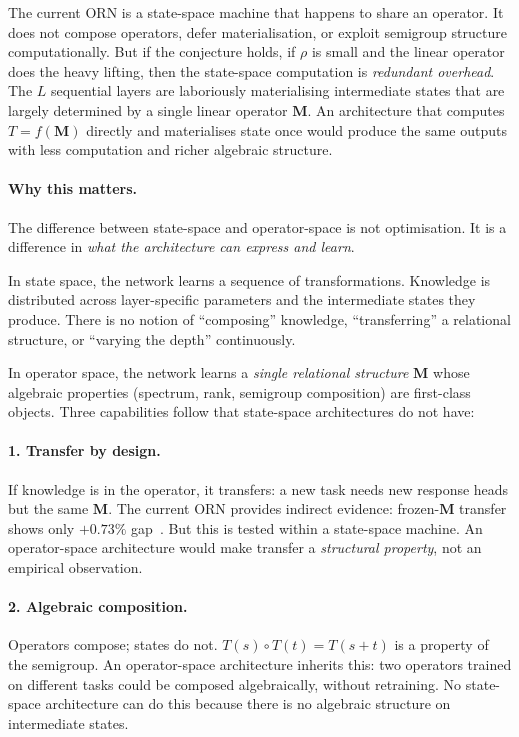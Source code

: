 \documentclass[11pt, a4paper]{article}
\newcommand{\M}{\mathbf{M}}
\theoremstyle{plain}
\theoremstyle{definition}
\theoremstyle{remark}
\begin{document}
The current ORN is a state-space machine that happens to share an operator.
It does not compose operators, defer materialisation, or exploit semigroup structure computationally.
But if the conjecture holds, if $\rho$ is small and the linear operator does the heavy lifting, then the state-space computation is \emph{redundant overhead}.
The $L$ sequential layers are laboriously materialising intermediate states that are largely determined by a single linear operator $\M$.
An architecture that computes $T = f(\M)$ directly and materialises state once would produce the same outputs with less computation and richer algebraic structure.

\paragraph{Why this matters.}
The difference between state-space and operator-space is not optimisation.
It is a difference in \emph{what the architecture can express and learn}.

In state space, the network learns a sequence of transformations.
Knowledge is distributed across layer-specific parameters and the intermediate states they produce.
There is no notion of ``composing'' knowledge, ``transferring'' a relational structure, or ``varying the depth'' continuously.

In operator space, the network learns a \emph{single relational structure} $\M$ whose algebraic properties (spectrum, rank, semigroup composition) are first-class objects.
Three capabilities follow that state-space architectures do not have:

\paragraph{1. Transfer by design.}
If knowledge is in the operator, it transfers: a new task needs new response heads but the same $\M$.
The current ORN provides indirect evidence: frozen-$\M$ transfer shows only $+0.73\%$ gap~\cite{orn_v2}.
But this is tested within a state-space machine.
An operator-space architecture would make transfer a \emph{structural property}, not an empirical observation.

\paragraph{2. Algebraic composition.}
Operators compose; states do not.
$T(s) \circ T(t) = T(s+t)$ is a property of the semigroup.
An operator-space architecture inherits this: two operators trained on different tasks could be composed algebraically, without retraining.
No state-space architecture can do this because there is no algebraic structure on intermediate states.
\end{document}
